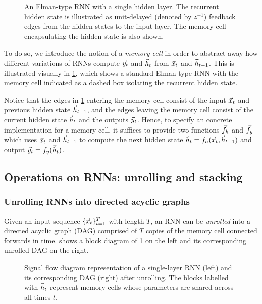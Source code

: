 \begin{figure}[tb]
  \centering
  
  \caption{An Elman-type RNN with a single hidden layer. The recurrent hidden
    state is illustrated as unit-delayed (denoted by $z^{-1}$) feedback edges
    from the hidden states to the input layer. The memory cell encapsulating the
  hidden state is also shown.}
  \label{fig:rnn-elman}
\end{figure}

To do so, we introduce the notion of a \emph{memory cell} in order to abstract
away how different variations of RNNs compute $\vec{y}_t$ and $\vec{h}_t$ from $\vec{x}_t$ and
$\vec{h}_{t-1}$. This is illustrated visually in \cref{fig:rnn-elman}, which shows a
standard Elman-type RNN \citep{elman1990finding} with the memory cell indicated
as a dashed box isolating the recurrent hidden state.

Notice that the edges in \cref{fig:rnn-elman} entering the memory cell
consist of the input $\vec{x}_t$ and previous hidden state $\vec{h}_{t-1}$,
and the edges leaving the memory cell consist of the current hidden state $\vec{h}_t$
and the outputs $\vec{y}_t$. Hence, to specify an concrete implementation for a
memory cell, it suffices to provide two functions $\vec{f}_h$ and $\vec{f}_y$ which
uses $\vec{x}_t$ and $\vec{h}_{t-1}$ to compute the next hidden state $\vec{h}_t = f_h(\vec{x}_t,
\vec{h}_{t-1})$ and output $\vec{y}_t = f_y(\vec{h}_t)$.

\subsection{Operations on RNNs: unrolling and stacking}

\subsubsection{Unrolling RNNs into directed acyclic graphs}


Given an input sequence $\{\vec{x}_{t}\}_{t=1}^T$ with length $T$, an RNN can be
\emph{unrolled} into a directed acyclic graph (DAG) comprised of $T$ copies of the
memory cell connected forwards in time.  shows
a block diagram of \cref{fig:rnn-elman} on the left and its corresponding unrolled
DAG on the right.

\begin{figure}[tb]
  \centering
  \resizebox{4.5in}{!}{}
  \caption{Signal flow diagram representation of a single-layer RNN (left) and its
    corresponding DAG (right) after unrolling. The blocks labelled
    with $\vec{h}_t$ represent memory cells whose parameters are shared across all times
  $t$.}
  \label{fig:rnn-single-unrolled}
\end{figure}

